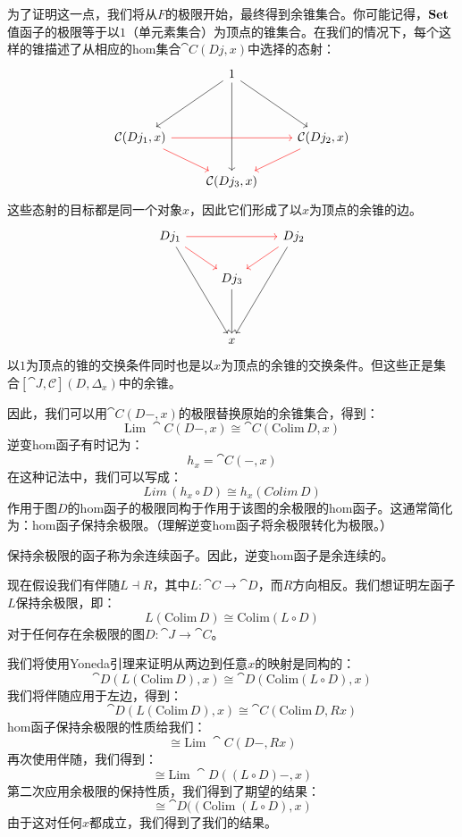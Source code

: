 \documentclass[DaoFP]{subfiles}
\begin{document}
为了证明这一点，我们将从$F$的极限开始，最终得到余锥集合。你可能记得，$\mathbf{Set}$值函子的极限等于以$1$（单元素集合）为顶点的锥集合。在我们的情况下，每个这样的锥描述了从相应的hom集合$\cat C(D j, x)$中选择的态射：
\[
 \begin{tikzcd}
  & 1
\arrow[ddr, ""]
 \arrow[ddl, ""']
 \arrow[ddd, ""]
 \\
\\
\cat C( D j_1, x)
\arrow[rr, red]
\arrow[rd, red]
&& \cat C( D j_2, x)
\arrow[dl, red]
\\
& \cat C( D j_3, x)
 \end{tikzcd}
\]
这些态射的目标都是同一个对象$x$，因此它们形成了以$x$为顶点的余锥的边。
\[
\begin{tikzcd}
 D j_1
 \arrow[rr, red]
 \arrow[dr, red]
 \arrow[dddr, ""']
 && D j_2
\arrow[dl, red]
 \arrow[dddl, ""]
 \\
 & D j_3
 \arrow[dd, ""]
 \\
 \\
 & x
 \end{tikzcd}
 \]
以$1$为顶点的锥的交换条件同时也是以$x$为顶点的余锥的交换条件。但这些正是集合$ [\cat J, \mathcal{C}](D, \Delta_x)$中的余锥。

因此，我们可以用$\cat C (D-, x)$的极限替换原始的余锥集合，得到：
\[ \text{Lim}\; \cat C (D-, x) \cong \cat C( \text{Colim}\,  D, x) \]
逆变hom函子有时记为：
\[ h_x = \cat C(-, x) \]
在这种记法中，我们可以写成：
\[ Lim \, (h_x \circ D) \cong h_x (Colim \, D) \]
作用于图$D$的hom函子的极限同构于作用于该图的余极限的hom函子。这通常简化为：hom函子保持余极限。（理解逆变hom函子将余极限转化为极限。）

保持余极限的函子称为余连续函子。因此，逆变hom函子是余连续的。

现在假设我们有伴随$L \dashv R$，其中$L \colon \cat C \to \cat D$，而$R$方向相反。我们想证明左函子$L$保持余极限，即：
\[ L (\text{Colim} \, D) \cong \text{Colim} (L \circ D) \]
对于任何存在余极限的图$D \colon \cat J \to \cat C$。

我们将使用Yoneda引理来证明从两边到任意$x$的映射是同构的：
\[ \cat D( L (\text{Colim} \, D), x) \cong \cat D (\text{Colim} (L \circ D), x) \]
我们将伴随应用于左边，得到：
\[ \cat D( L (\text{Colim} \, D), x) \cong \cat C (\text{Colim}\, D, R x) \]
hom函子保持余极限的性质给我们：
\[ \cong \text{Lim}\; \cat C(D -, R x) \]
再次使用伴随，我们得到：
\[ \cong \text{Lim}\; \cat D((L \circ D) -, x) \]
第二次应用余极限的保持性质，我们得到了期望的结果：
\[ \cong  \cat D((\text{Colim}\;(L \circ D), x) \]
由于这对任何$x$都成立，我们得到了我们的结果。
\end{document}
